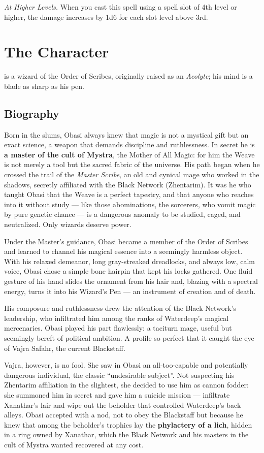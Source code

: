 \documentclass[letterpaper,twocolumn,openany,nodeprecatedcode,justified]{dndbook}
\begin{document}
\emph{At Higher Levels.} When you cast this spell using a spell slot of 4th level or higher, the damage increases by 1d6 for each slot level above 3rd.

\chapter*{The Character}

 is a wizard of the Order of Scribes,
originally raised as an \emph{Acolyte}; his mind is a blade as sharp as
his pen.

\section{Biography}
Born in the slums, Obasi always knew that magic is not a mystical gift
but an exact science, a weapon that demands discipline and ruthlessness.
In secret he is \textbf{a master of the cult of Mystra}, the Mother of
All Magic: for him the Weave is not merely a tool but the sacred fabric
of the universe. His path began when he crossed the trail of the
\emph{Master Scribe}, an old and cynical mage who worked in the shadows,
secretly affiliated with the Black Network (Zhentarim). It was he who
taught Obasi that the Weave is a perfect tapestry, and that anyone who
reaches into it without study --- like those abominations, the sorcerers,
who vomit magic by pure genetic chance --- is a dangerous anomaly to be
studied, caged, and neutralized. Only wizards deserve power.

Under the Master's guidance, Obasi became a member of the Order of
Scribes and learned to channel his magical essence into a seemingly
harmless object. With his relaxed demeanor, long gray-streaked dreadlocks,
and always low, calm voice, Obasi chose a simple bone hairpin that kept
his locks gathered. One fluid gesture of his hand slides the ornament
from his hair and, blazing with a spectral energy, turns it into his
Wizard's Pen --- an instrument of creation and of death.

His composure and ruthlessness drew the attention of the Black Network's
leadership, who infiltrated him among the ranks of Waterdeep's magical
mercenaries. Obasi played his part flawlessly: a taciturn mage, useful
but seemingly bereft of political ambition. A profile so perfect that it
caught the eye of Vajra Safahr, the current Blackstaff.

Vajra, however, is no fool. She saw in Obasi an all-too-capable and
potentially dangerous individual, the classic ``undesirable subject''.
Not suspecting his Zhentarim affiliation in the slightest, she decided
to use him as cannon fodder: she summoned him in secret and gave him a
suicide mission --- infiltrate Xanathar's lair and wipe out the beholder
that controlled Waterdeep's back alleys. Obasi accepted with a nod, not
to obey the Blackstaff but because he knew that among the beholder's
trophies lay the \textbf{phylactery of a lich}, hidden in a ring owned by
Xanathar, which the Black Network and his masters in the cult of Mystra
wanted recovered at any cost.
\end{document}
